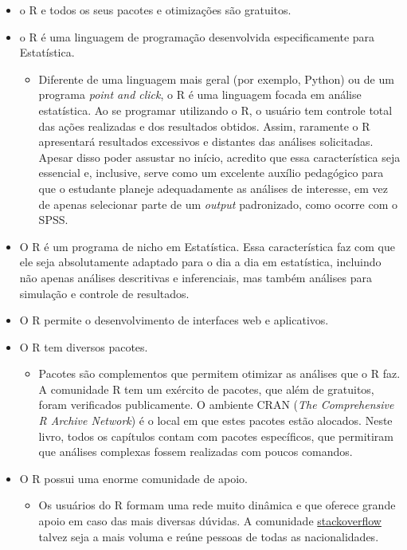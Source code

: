 \documentclass[
]{book}
\providecommand{\tightlist}{%
  \setlength{\itemsep}{0pt}\setlength{\parskip}{0pt}}
\begin{document}
\begin{itemize}
\item
  o R e todos os seus pacotes e otimizações são gratuitos.
\item
  o R é uma linguagem de programação desenvolvida especificamente para Estatística.

  \begin{itemize}
  \tightlist
  \item
    Diferente de uma linguagem mais geral (por exemplo, Python) ou de um programa \emph{point and click}, o R é uma linguagem focada em análise estatística. Ao se programar utilizando o R, o usuário tem controle total das ações realizadas e dos resultados obtidos. Assim, raramente o R apresentará resultados excessivos e distantes das análises solicitadas. Apesar disso poder assustar no início, acredito que essa característica seja essencial e, inclusive, serve como um excelente auxílio pedagógico para que o estudante planeje adequadamente as análises de interesse, em vez de apenas selecionar parte de um \emph{output} padronizado, como ocorre com o SPSS.
  \end{itemize}
\item
  O R é um programa de nicho em Estatística. Essa característica faz com que ele seja absolutamente adaptado para o dia a dia em estatística, incluindo não apenas análises descritivas e inferenciais, mas também análises para simulação e controle de resultados.
\item
  O R permite o desenvolvimento de interfaces web e aplicativos.
\item
  O R tem diversos pacotes.

  \begin{itemize}
  \tightlist
  \item
    Pacotes são complementos que permitem otimizar as análises que o R faz. A comunidade R tem um exército de pacotes, que além de gratuitos, foram verificados publicamente. O ambiente CRAN (\emph{The Comprehensive R Archive Network}) é o local em que estes pacotes estão alocados. Neste livro, todos os capítulos contam com pacotes específicos, que permitiram que análises complexas fossem realizadas com poucos comandos.
  \end{itemize}
\item
  O R possui uma enorme comunidade de apoio.

  \begin{itemize}
  \tightlist
  \item
    Os usuários do R formam uma rede muito dinâmica e que oferece grande apoio em caso das mais diversas dúvidas. A comunidade \href{https://stackoverflow.com/}{stackoverflow} talvez seja a mais voluma e reúne pessoas de todas as nacionalidades.
  \end{itemize}
\end{itemize}
\end{document}
